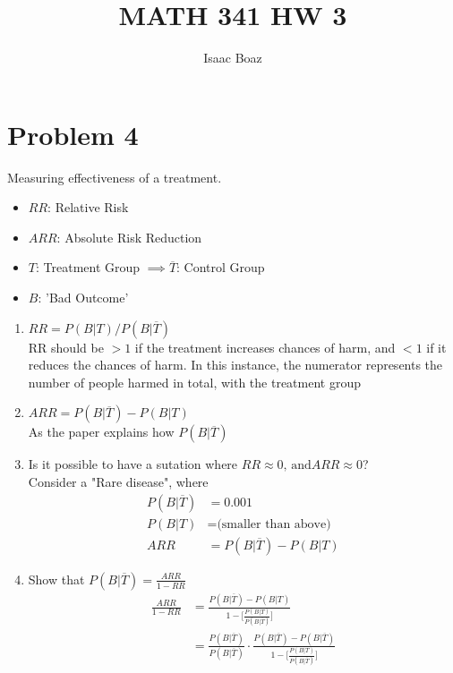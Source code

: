 \documentclass{article}
\title{\vspace{-5ex}MATH 341 HW 3}
\author{Isaac Boaz}
\begin{document}
\maketitle

\section*{Problem 4}
Measuring effectiveness of a treatment.
\begin{itemize}[noitemsep]
    \item \(RR\): Relative Risk
    \item \(ARR\): Absolute Risk Reduction
    \item \(T\): Treatment Group \(\implies \overline{T}\): Control Group
    \item \(B\): 'Bad Outcome'
\end{itemize}


\begin{enumerate}[label=\alph*)]
    \item \(RR = P(B \vert T) / P(B \vert \overline{T})\) \\
    RR should be \(> 1\) if the treatment increases chances of harm, and \(< 1\) if it reduces the chances of harm.
    In this instance, the numerator represents the number of people harmed in total, with the treatment group 
    \item \(ARR = P(B \vert \overline{T}) - P(B \vert T)\) \\
    As the paper explains how \(P(B \vert \overline{T})\) 
    \item Is it possible to have a sutation where \(RR \approx 0 \text{, and} ARR \approx 0\)? \\
    Consider a "Rare disease", where
    \begin{align*}
        P(B \vert \overline{T}) &= 0.001 \\
        P(B \vert T) &= \text{(smaller than above)} \\
        ARR &= P(B \vert \overline{T}) - P(B \vert T)
    \end{align*}
    \item Show that \(P(B \vert \overline{T}) = \frac{ARR}{1-RR}\)
    \begin{align*}
        \frac{
            ARR
        }{
            1-RR
        } &= 
        \frac{
            P(B \vert \overline{T}) - P(B \vert T)
        }
        {
            1 - \lbrack 
                \frac{
                    P (B \vert T)
                }{
                    P(B \vert \overline{T})
                } \rbrack
        } \\
        &=
        \frac{
            P(B \vert \overline{T})
        }
        {
            P(B \vert \overline{T})
        } \cdot
        \frac{
            P(B \vert \overline{T}) - P(B \vert \overline{T})
        }
        {
            1 - \lbrack \frac{
                P (B \vert T)
                }
                {
                    P (B \vert \overline{T})
                } \rbrack
        }
    \end{align*}
\end{enumerate}
\end{document}

